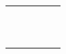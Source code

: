 \documentclass{report}
\begin{document}
\begin{problem}
\begin{enumerate}
\begin{table}[H]
\begin{tabular*}{1.0\textwidth}{c | c | c | c | c}
               &                            &                            &                                                                        &                                               \\ 
               &                            &                            &                                                                        &                                               \\ 
               &                            &                            &                                                                        &                                               \\ 
               &                            &                            &                                                                        &                                               \\ 
               &                            &                            &                                                                        &                                               \\ 
               &                            &                            &                                                                        &                                               \\ 
               &                            &                            &                                                                        &                                               \\ 
               &                            &                            &                                                                        &                                               \\ 
               &                            &                            &                                                                        &                                               \\ 
               &                            &                            &                                                                        &                                               \\ 
    \end{tabular*}
  \end{table}


\end{enumerate}
\end{problem}
\end{document}

